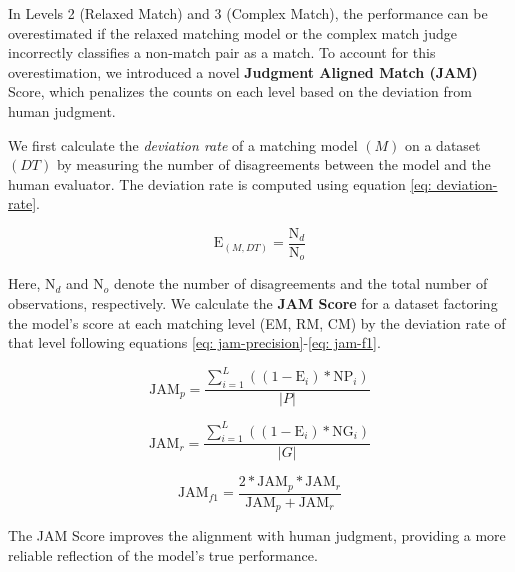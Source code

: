 In Levels 2 (Relaxed Match) and 3 (Complex Match), the performance can be overestimated if the relaxed matching model or the complex match judge incorrectly classifies a non-match pair as a match. To account for this overestimation, we introduced a novel \textbf{Judgment Aligned Match (JAM)} Score, which penalizes the counts on each level based on the deviation from human judgment. %

We first calculate the \textit{deviation rate} of a matching model $(M)$ on a dataset $(DT)$ by measuring the number of disagreements between the model and the human evaluator. The deviation rate is computed using equation \ref{eq: deviation-rate}. 

\begin{equation}
    \text{E}_{(M, DT)} = \frac{\text{N}_d}{\text{N}_o}
    \label{eq: deviation-rate}
\end{equation}

Here, $\text{N}_d$ and $\text{N}_o$ denote the number of disagreements and the total number of observations, respectively. We calculate the \textbf{JAM Score} for a dataset factoring the model’s score at each matching level (EM, RM, CM) by the deviation rate of that level following equations \ref{eq: jam-precision}-\ref{eq: jam-f1}.

{\small
\begin{equation}
   \text{JAM}_p = \frac{\sum_{i=1}^{L} ((1-\text{E}_{i}) * \text{NP}_{i})}{|P|}
      \label{eq: jam-precision}
\end{equation}

\begin{equation}
   \text{JAM}_r = \frac{\sum_{i=1}^{L} ((1-\text{E}_{i}) * \text{NG}_{i})}{|G|}
   \label{eq: jam-recall}
\end{equation}

\begin{equation}
   \text{JAM}_{f1} = \frac{2 * \text{JAM}_p * \text{JAM}_r}{\text{JAM}_p + \text{JAM}_r}
   \label{eq: jam-f1}
\end{equation}
}

The JAM Score improves the alignment with human judgment, providing a more reliable reflection of the model’s true performance. 
